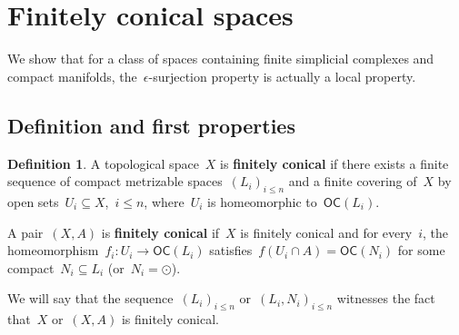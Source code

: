 \documentclass[english,11pt]{article}
\theoremstyle{plain}
\theoremstyle{remark}
\theoremstyle{definition}
\newtheorem{definition}{Definition}[section]
\newcommand{\id}{\mathrm{id}}
\newcommand{\Ne}{\mathcal{N}}
\newcommand{\unit}{\odot}%
\newcommand{\OC}[1]{\mathsf{OC}(#1)}%
\begin{document}
%
%





\section{Finitely conical spaces}\label{sec_conical}
We show that for a class of spaces containing finite simplicial complexes and compact manifolds, the~$\epsilon$-surjection property is actually a local property.

\subsection{Definition and first properties}
\begin{definition}\label{def_locally_conical}
A topological space~$X$ is \textbf{finitely conical} if there exists a finite sequence of compact metrizable spaces~$(L_i)_{i\leq n}$ and a finite covering of~$X$ by open sets~$U_i\subseteq X$,~$i\leq n$, where~$U_i$ is homeomorphic to~$\OC{L_i}$.

A pair~$(X,A)$ is \textbf{finitely conical} if~$X$ is finitely conical and for every~$i$, the homeomorphism~$f_i:U_i\to\OC{L_i}$ satisfies~$f(U_i\cap A)=\OC{N_i}$ for some compact~$N_i\subseteq L_i$ (or~$N_i=\unit$).
\end{definition}
We will say that the sequence~$(L_i)_{i\leq n}$ or~$(L_i,N_i)_{i\leq n}$ witnesses the fact that~$X$ or~$(X,A)$ is finitely conical.
\end{document}
